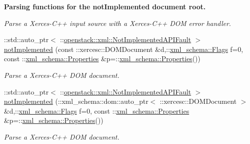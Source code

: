 \begin{Indent}{\bf Parsing functions for the notImplemented document root.}
\begin{DoxyCompactItemize}
\begin{DoxyCompactList}\small\item\em Parse a Xerces-\/C++ input source with a Xerces-\/C++ DOM error handler. \item\end{DoxyCompactList}\item 
::std::auto\_\-ptr$<$ ::\hyperlink{classopenstack_1_1xml_1_1NotImplementedAPIFault}{openstack::xml::NotImplementedAPIFault} $>$ \hyperlink{namespaceopenstack_1_1xml_a395f5c8b8afd507723763857e0d83afa}{notImplemented} (const ::xercesc::DOMDocument \&d,::\hyperlink{namespacexml__schema_affb4c227cbd9aa7453dd1dc5a1401943}{xml\_\-schema::Flags} f=0, const ::\hyperlink{namespacexml__schema_ad27ce19a7ee1d3b1064092648898f64c}{xml\_\-schema::Properties} \&p=::\hyperlink{namespacexml__schema_ad27ce19a7ee1d3b1064092648898f64c}{xml\_\-schema::Properties}())
\begin{DoxyCompactList}\small\item\em Parse a Xerces-\/C++ DOM document. \item\end{DoxyCompactList}\item 
::std::auto\_\-ptr$<$ ::\hyperlink{classopenstack_1_1xml_1_1NotImplementedAPIFault}{openstack::xml::NotImplementedAPIFault} $>$ \hyperlink{namespaceopenstack_1_1xml_a25bef19575c6fb6431b8f28be6619758}{notImplemented} (::xml\_\-schema::dom::auto\_\-ptr$<$ ::xercesc::DOMDocument $>$ \&d,::\hyperlink{namespacexml__schema_affb4c227cbd9aa7453dd1dc5a1401943}{xml\_\-schema::Flags} f=0, const ::\hyperlink{namespacexml__schema_ad27ce19a7ee1d3b1064092648898f64c}{xml\_\-schema::Properties} \&p=::\hyperlink{namespacexml__schema_ad27ce19a7ee1d3b1064092648898f64c}{xml\_\-schema::Properties}())
\begin{DoxyCompactList}\small\item\em Parse a Xerces-\/C++ DOM document. \item\end{DoxyCompactList}\end{DoxyCompactItemize}
\end{Indent}
